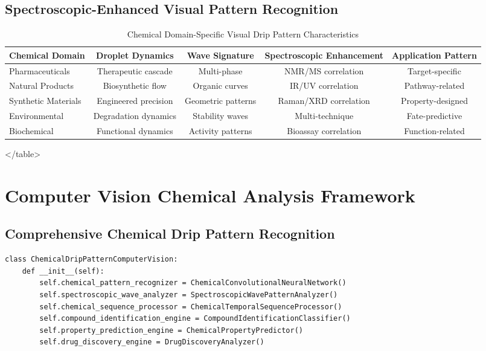 \documentclass[12pt,a4paper]{article}
\begin{document}
\begin{algorithm}
\begin{algorithmic}[1]
\subsection{Spectroscopic-Enhanced Visual Pattern Recognition}

\begin{table}[H]
\centering
\caption{Chemical Domain-Specific Visual Drip Pattern Characteristics}
\begin{tabular}{lcccc}
\toprule
Chemical Domain & Droplet Dynamics & Wave Signature & Spectroscopic Enhancement & Application Pattern \\
\midrule
Pharmaceuticals & Therapeutic cascade & Multi-phase & NMR/MS correlation & Target-specific \\
Natural Products & Biosynthetic flow & Organic curves & IR/UV correlation & Pathway-related \\
Synthetic Materials & Engineered precision & Geometric patterns & Raman/XRD correlation & Property-designed \\
Environmental & Degradation dynamics & Stability waves & Multi-technique & Fate-predictive \\
Biochemical & Functional dynamics & Activity patterns & Bioassay correlation & Function-related \\
\bottomrule
\end{tabular}
</table>

\section{Computer Vision Chemical Analysis Framework}

\subsection{Comprehensive Chemical Drip Pattern Recognition}

\begin{lstlisting}[style=pythonstyle, caption=Computer Vision Comprehensive Chemical Pattern Analysis]
class ChemicalDripPatternComputerVision:
    def __init__(self):
        self.chemical_pattern_recognizer = ChemicalConvolutionalNeuralNetwork()
        self.spectroscopic_wave_analyzer = SpectroscopicWavePatternAnalyzer()
        self.chemical_sequence_processor = ChemicalTemporalSequenceProcessor()
        self.compound_identification_engine = CompoundIdentificationClassifier()
        self.property_prediction_engine = ChemicalPropertyPredictor()
        self.drug_discovery_engine = DrugDiscoveryAnalyzer()
        

\end{lstlisting}
\end{table}
\end{algorithmic}
\end{algorithm}
\end{document}
